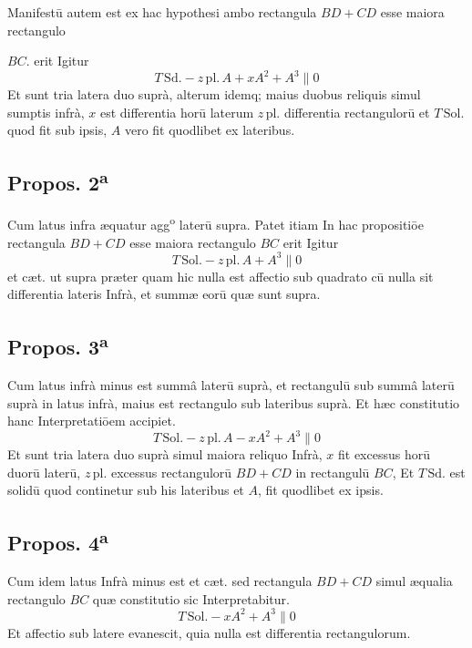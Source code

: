 \documentclass[11pt,a4paper]{article}
\begin{document}
Manifestū autem est ex hac hypothesi ambo rectangula $BD + CD$ esse maiora rectangulo


$BC$. erit Igitur
\[ T\,\mathrm{Sd.} - z\,\mathrm{pl.}\,A + xA^{2} + A^{3} \parallel 0 \]
Et sunt tria latera duo suprà, alterum idemq; maius duobus reliquis simul sumptis infrà, $x$ est differentia horū laterum $z\,\mathrm{pl.}$ differentia rectangulorū et $T\,\mathrm{Sol.}$ quod fit sub ipsis, $A$ vero fit quodlibet ex lateribus.

\subsection*{Propos. 2\textsuperscript{a}}

Cum latus infra æquatur agg\textsuperscript{o} laterū supra. Patet itiam In hac propositiōe rectangula $BD + CD$ esse maiora rectangulo $BC$ erit Igitur
\[ T\,\mathrm{Sol.} - z\,\mathrm{pl.}\,A + A^{3} \parallel 0 \]
et cæt. ut supra præter quam hic nulla est affectio sub quadrato cū nulla sit differentia lateris Infrà, et summæ eorū quæ sunt supra.

\subsection*{Propos. 3\textsuperscript{a}}

Cum latus infrà minus est summâ laterū suprà, et rectangulū sub summâ laterū suprà in latus infrà, maius est rectangulo sub lateribus suprà. Et hæc constitutio hanc Interpretatiōem accipiet.
\[ T\,\mathrm{Sol.} - z\,\mathrm{pl.}\,A - xA^{2} + A^{3} \parallel 0 \]
Et sunt tria latera duo suprà simul maiora reliquo Infrà, $x$ fit excessus horū duorū laterū, $z\,\mathrm{pl.}$ excessus rectangulorū $BD + CD$ in rectangulū $BC$, Et $T\,\mathrm{Sd.}$ est solidū quod continetur sub his lateribus et $A$, fit quodlibet ex ipsis.

\subsection*{Propos. 4\textsuperscript{a}}

Cum idem latus Infrà minus est et cæt. sed rectangula $BD + CD$ simul æqualia rectangulo $BC$ quæ constitutio sic Interpretabitur.
\[ T\,\mathrm{Sol.} - xA^{2} + A^{3} \parallel 0 \]
Et affectio sub latere evanescit, quia nulla est differentia rectangulorum.
\end{document}
